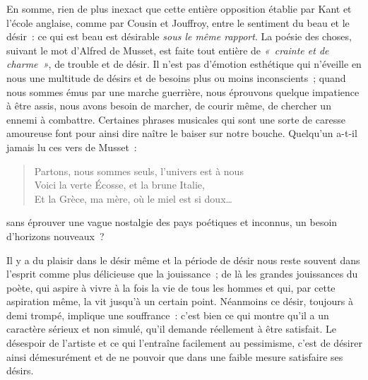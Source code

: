 \documentclass[french,twoside]{book} %
\begin{document}
\par
En somme, rien de plus inexact que cette entière opposition établie par Kant et l’école anglaise, comme par Cousin et Jouffroy, entre le sentiment du beau et le désir : ce qui est beau est désirable \emph{sous le même rapport}. La poésie des choses, suivant le mot d’Alfred de Musset, est faite tout entière de \emph{« crainte et de charme »}, de trouble et de désir. Il n’est pas d’émotion esthétique qui n’éveille en nous une multitude de désirs et de besoins plus ou moins inconscients ; quand nous sommes émus par une marche guerrière, nous éprouvons quelque impatience à être assis, nous avons besoin de marcher, de courir même, de chercher un ennemi à combattre. Certaines phrases musicales qui sont une sorte de caresse amoureuse font pour ainsi dire naître le baiser sur notre bouche. Quelqu’un a-t-il jamais lu ces vers de Musset :\par


\begin{verse}
Partons, nous sommes seuls, l’univers est à nous\\
Voici la verte Écosse, et la brune Italie,\\
Et la Grèce, ma mère, où le miel est si doux…\\
\end{verse}

\noindent sans éprouver une vague nostalgie des pays poétiques et inconnus, un besoin d’horizons nouveaux ?\par
Il y a du plaisir dans le désir même et la période de désir nous reste souvent dans l’esprit comme plus délicieuse que la jouissance ; de là les grandes jouissances  du poète, qui aspire à vivre à la fois la vie de tous les hommes et qui, par cette aspiration même, la vit jusqu’à un certain point. Néanmoins ce désir, toujours à demi trompé, implique une souffrance : c’est bien ce qui montre qu’il a un caractère sérieux et non simulé, qu’il demande réellement à être satisfait. Le désespoir de l’artiste et ce qui l’entraîne facilement au pessimisme, c’est de désirer ainsi démesurément et de ne pouvoir que dans une faible mesure satisfaire ses désirs.
\end{document}
